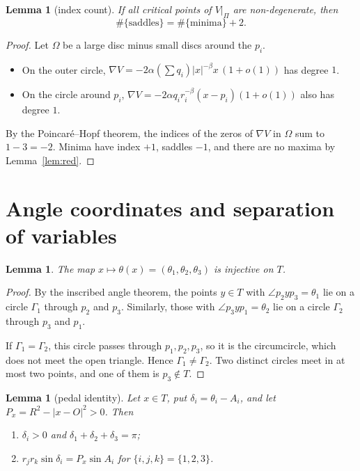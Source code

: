 \documentclass[11pt]{amsart}
\newtheorem{lemma}[theorem]{Lemma}
\theoremstyle{remark}
\begin{document}
\begin{lemma}[index count]\label{lem:index}
If all critical points of $V|_\Pi$ are non-degenerate, then
\[
  \#\{\text{saddles}\}=\#\{\text{minima}\}+2.
\]
\end{lemma}

\begin{proof}
Let $\Omega$ be a large disc minus small discs around the $p_i$.
\begin{itemize}
\item On the outer circle, $\nabla V=-2\alpha(\sum q_i)|x|^{-\beta}x\,(1+o(1))$ has degree $1$.
\item On the circle around $p_i$, $\nabla V=-2\alpha q_ir_i^{-\beta}(x-p_i)(1+o(1))$ also has degree $1$.
\end{itemize}
By the Poincar\'e--Hopf theorem, the indices of the zeros of $\nabla V$ in $\Omega$ sum to $1-3=-2$. Minima have
index $+1$, saddles $-1$, and there are no maxima by Lemma~\ref{lem:red}.
\end{proof}

\section{Angle coordinates and separation of variables}

\begin{lemma}\label{lem:inj}
The map $x\mapsto\theta(x)=(\theta_1,\theta_2,\theta_3)$ is injective on $T$.
\end{lemma}

\begin{proof}
By the inscribed angle theorem, the points $y\in T$ with $\angle p_2yp_3=\theta_1$ lie on a circle $\Gamma_1$ through
$p_2$ and $p_3$. Similarly, those with $\angle p_3yp_1=\theta_2$ lie on a circle $\Gamma_2$ through $p_3$ and $p_1$.

If $\Gamma_1=\Gamma_2$, this circle passes through $p_1,p_2,p_3$, so it is the circumcircle, which does not meet the
open triangle. Hence $\Gamma_1\ne\Gamma_2$. Two distinct circles meet in at most two points, and one of them is
$p_3\notin T$.
\end{proof}

\begin{lemma}[pedal identity]\label{lem:pedal}
Let $x\in T$, put $\delta_i=\theta_i-A_i$, and let $P_x=R^2-|x-O|^2>0$. Then
\begin{enumerate}
\item[(a)] $\delta_i>0$ and $\delta_1+\delta_2+\delta_3=\pi$;
\item[(b)] $r_jr_k\sin\delta_i=P_x\sin A_i$ for $\{i,j,k\}=\{1,2,3\}$.
\end{enumerate}
\end{lemma}
\end{document}
